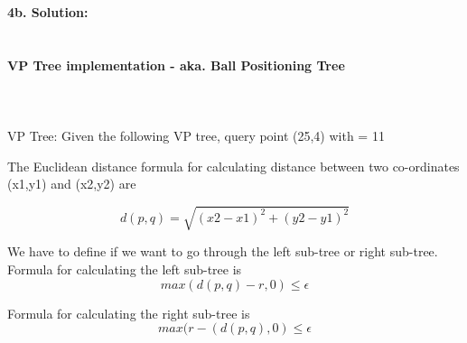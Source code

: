 \documentclass{article}
\begin{document}
\newpage

\textbf{4b. Solution:}
\\
\\
\\
\textbf{VP Tree implementation - aka. Ball Positioning Tree}
\\
\\
\\
\\
VP Tree: Given the following VP tree, query point (25,4) with \epsilon = 11

The Euclidean distance formula for calculating distance between two co-ordinates (x1,y1) and (x2,y2) are


\[ d(p,q) = \sqrt{(x2-x1)^2+{(y2-y1)^2}} \]

We have to define if we want to go through the left sub-tree or right sub-tree.
Formula for calculating the left sub-tree is 
\[ {max(d(p,q)-r,0) \le \epsilon } \]

Formula for calculating the right sub-tree is
\[ {max(r-(d(p,q),0)  \le \epsilon } \]

\\
\end{document}
